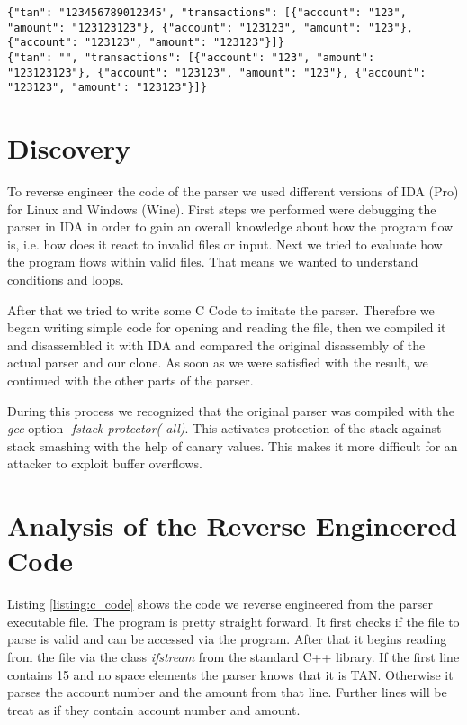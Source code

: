 \begin{lstlisting}[caption=JSON Output,label=listing:json_output]
{"tan": "123456789012345", "transactions": [{"account": "123", "amount": "123123123"}, {"account": "123123", "amount": "123"}, {"account": "123123", "amount": "123123"}]}
{"tan": "", "transactions": [{"account": "123", "amount": "123123123"}, {"account": "123123", "amount": "123"}, {"account": "123123", "amount": "123123"}]}
\end{lstlisting}

\section{Discovery}

To reverse engineer the code of the parser we used different versions of IDA (Pro) for Linux and Windows (Wine). First steps we performed were debugging the parser in IDA in order to gain an overall knowledge about how the program flow is, i.e. how does it react to invalid files or input. Next we tried to evaluate how the program flows within valid files. That means we wanted to understand conditions and loops.

After that we tried to write some C Code to imitate the parser. Therefore we began writing simple code for opening and reading the file, then we compiled it and disassembled it with IDA and compared the original disassembly of the actual parser and our clone. As soon as we were satisfied with the result, we continued with the other parts of the parser.

During this process we recognized that the original parser was compiled with the \textit{gcc} option \textit{-fstack-protector(-all)}. This activates protection of the stack against stack smashing with the help of canary values. This makes it more difficult for an attacker to exploit buffer overflows.

\section{Analysis of the Reverse Engineered Code}

Listing \ref{listing:c_code}  shows the code we reverse engineered from the parser executable file. The program is pretty straight forward. It first checks if the file to parse is valid and can be accessed via the program. After that it begins reading from the file via the class \textit{ifstream} from the standard C++ library. If the first line contains 15 and no space elements the parser knows that it is TAN. Otherwise it parses the account number and the amount from that line. Further lines will be treat as if they contain account number and amount.

